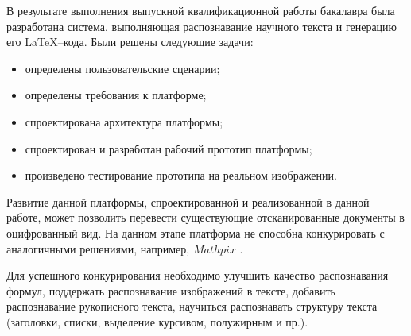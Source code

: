 \conclusion

В результате выполнения выпускной квалификационной работы бакалавра была разработана система, выполняющая распознавание научного текста и генерацию его \LaTeX--кода. Были решены следующие задачи:
\begin{itemize}
    \item определены пользовательские сценарии;
    \item определены требования к платформе;
    \item спроектирована архитектура платформы;
    \item спроектирован и разработан рабочий прототип платформы;
    \item произведено тестирование прототипа на реальном изображении.
\end{itemize}

Развитие данной платформы, спроектированной и реализованной в данной работе, может позволить перевести существующие отсканированные документы в оцифрованный вид. На данном этапе платформа не способна конкурировать с аналогичными решениями, например, $Mathpix$ \cite{mathpix}.

Для успешного конкурирования необходимо улучшить качество распознавания формул, поддержать распознавание изображений в тексте, добавить распознавание рукописного текста, научиться распознавать структуру текста (заголовки, списки, выделение курсивом, полужирным и пр.).